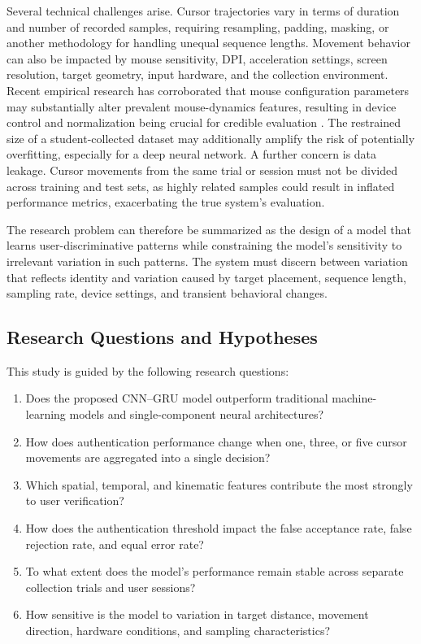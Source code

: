 \documentclass[conference]{IEEEtran}
\begin{document}
Several technical challenges arise. Cursor trajectories vary in terms of duration and number of recorded samples, requiring resampling, padding, masking, or another methodology for handling unequal sequence lengths. Movement behavior can also be impacted by mouse sensitivity, DPI, acceleration settings, screen resolution, target geometry, input hardware, and the collection environment. Recent empirical research has corroborated that mouse configuration parameters may substantially alter prevalent mouse-dynamics features, resulting in device control and normalization being crucial for credible evaluation \cite{kuricMouseCredibility}. The restrained size of a student-collected dataset may additionally amplify the risk of potentially overfitting, especially for a deep neural network. A further concern is data leakage. Cursor movements from the same trial or session must not be divided across training and test sets, as highly related samples could result in inflated performance metrics, exacerbating the true system's evaluation.

The research problem can therefore be summarized as the design of a model that learns user-discriminative patterns while constraining the model's sensitivity to irrelevant variation in such patterns. The system must discern between variation that reflects identity and variation caused by target placement, sequence length, sampling rate, device settings, and transient behavioral changes.

\subsection{Research Questions and Hypotheses}
This study is guided by the following research questions:

\begin{enumerate}
    \item Does the proposed CNN--GRU model outperform traditional machine-learning models and single-component neural architectures?

    \item How does authentication performance change when one, three, or five cursor movements are aggregated into a single decision?

    \item Which spatial, temporal, and kinematic features contribute the most strongly to user verification?

    \item How does the authentication threshold impact the false acceptance rate, false rejection rate, and equal error rate?

    \item To what extent does the model's performance remain stable across separate collection trials and user sessions?

    \item How sensitive is the model to variation in target distance, movement direction, hardware conditions, and sampling characteristics?
    
\end{enumerate}
\end{document}
